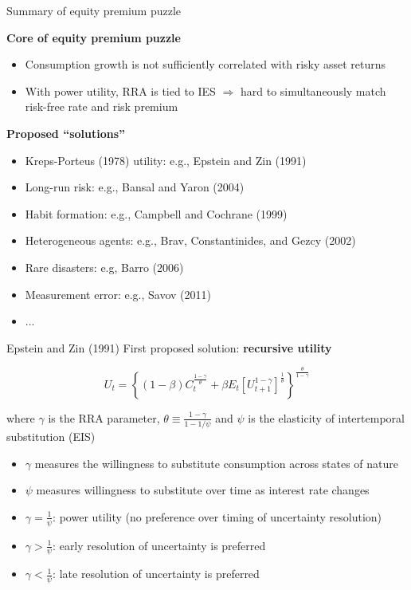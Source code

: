 \documentclass[xcolor=table, aspectratio=169]{beamer}
\newcommand{\alertbf}[1]{\alert{\textbf{#1}}}
\begin{document}
\begin{frame}{Summary of equity premium puzzle}

\alertbf{Core of equity premium puzzle}

\begin{itemize}
\item Consumption growth is not sufficiently correlated with risky asset returns
\item With power utility, RRA is tied to IES $\Rightarrow$ hard to simultaneously match risk-free rate and risk premium
\end{itemize}


\alertbf{Proposed ``solutions''}

\begin{itemize}

\item Kreps-Porteus (1978) utility: e.g., Epstein and Zin (1991)

\item Long-run risk: e.g., Bansal and Yaron (2004)

\item Habit formation: e.g., Campbell and Cochrane (1999)

\item Heterogeneous agents: e.g., Brav, Constantinides, and Gezcy (2002)

\item Rare disasters: e.g, Barro (2006)

\item Measurement error: e.g., Savov (2011)

\item ...

\end{itemize}

\end{frame}

\begin{frame}{Epstein and Zin (1991)}
First proposed solution: \alertbf{recursive utility}

$$U_t = \left\{ (1- \beta ) C_t^{\frac{1-\gamma}{\theta}} + \beta E_t[U_{t+1}^{1-\gamma}]^{\frac{1}{\theta}}\right\}^{\frac{\theta}{1-\gamma}}$$

where $\gamma$ is the RRA parameter, $\theta \equiv \frac{1-\gamma}{1-1 / \psi}$ and $\psi$ is the elasticity of intertemporal substitution (EIS)
\begin{itemize}
\item $\gamma$ measures the willingness to substitute consumption across states of nature
\item $\psi$ measures willingness to substitute over time as interest rate changes

\item $\gamma = \frac{1}{\psi}$: power utility (no preference over timing of uncertainty resolution)
\item $\gamma > \frac{1}{\psi}$: early resolution of uncertainty is preferred
\item $\gamma < \frac{1}{\psi}$: late resolution of uncertainty is preferred
\end{itemize}
\end{frame}
\end{document}
